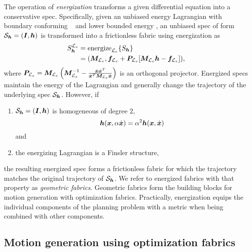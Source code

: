 The operation of \textit{energization} transforms a given differential equation into
a conservative spec.
Specifically, given an unbiased energy Lagrangian \le{} with boundary conforming
\Me{}~\cite[Definition~4.6]{Ratliff2020} and
lower bounded energy \he{}, an unbiased spec of form $\mathcal{S}_{\bm{h}} = (\bm{I},\bm{h})$
is transformed into a frictionless fabric using energization as
\begin{equation}
  \begin{split}
  S_{\bm{h}}^{\mathcal{L}_e} &= \text{energize}_{\mathcal{L}_e}\{S_{\bm{h}}\} \\
    &= (\bm{M}_{\mathcal{L}_e}, \bm{f}_{\mathcal{L}_e} + \bm{P}_{\mathcal{L}_e}[\bm{M}_{\mathcal{L}_e}\bm{h} - \bm{f}_{\mathcal{L}_e}]), 
  \end{split}
\end{equation}
where $\bm{P}_{\mathcal{L}_e} = \bm{M}_{\mathcal{L}_e}\left(\bm{M}_{\mathcal{L}_e}^{-1} - \frac{\dot{\bm{x}}\dot{\bm{x}}^T}{\dot{\bm{x}}^T\bm{M}_{\mathcal{L}_e}\dot{\bm{x}}}\right)$ is an
orthogonal projector.
Energized specs maintain the energy of the Lagrangian and generally change
the trajectory of the underlying spec $\mathcal{S}_{\bm{h}}$.
However, if 
\begin{enumerate}
  \item $\mathcal{S}_{\bm{h}} = (\bm{I},\bm{h})$ is homogeneous of degree 2,
    \begin{equation}\bm{h}(\bm{x}, \alpha\dot{\bm{x}}) = \alpha^2\bm{h}(\bm{x}, \dot{\bm{x}})\label{eq:homogeneous}\end{equation}
    and
  \item the energizing Lagrangian is a Finsler structure, 
\end{enumerate}
the resulting energized spec forms a frictionless fabric for which the trajectory matches
the original trajectory of $\mathcal{S}_{\bm{h}}$. We refer to energized fabrics with that
property as \textit{geometric fabrics}. Geometric fabrics form the building blocks for
motion generation with optimization fabrics.
Practically, energization equips the individual components of the planning problem
with a metric when being combined with other components.


\subsection{Motion generation using optimization fabrics}%
\label{sub:trajectory_generation_using_optimization_fabrics}

